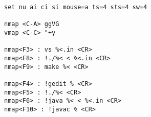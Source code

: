 \begin{lstlisting}
set nu ai ci si mouse=a ts=4 sts=4 sw=4

nmap <C-A> ggVG
vmap <C-C> "+y

nmap<F3> : vs %<.in <CR>
nmap<F8> : !./%< < %<.in <CR>
nmap<F9> : make %< <CR>

nmap<F4> : !gedit % <CR>
nmap<F5> : !./%< <CR>
nmap<F6> : !java %< < %<.in <CR>
nmap<F10> : !javac % <CR>
\end{lstlisting}
